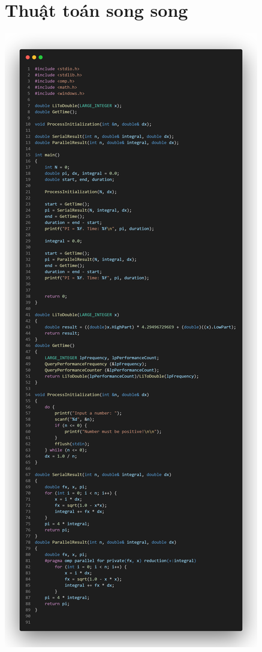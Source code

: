 \documentclass[12pt,a4paper]{report}
\begin{document}
\section{Thuật toán song song}
\begin{center}
	\includegraphics[trim=0in 33in 0in 0in, clip, scale=0.25]{./Photos/PI/parallel.PNG}

\end{center}
\end{document}
